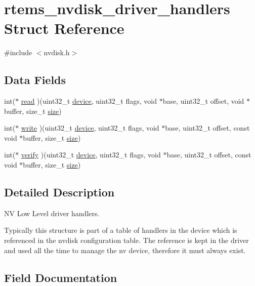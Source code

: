 \hypertarget{structrtems__nvdisk__driver__handlers}{}\section{rtems\+\_\+nvdisk\+\_\+driver\+\_\+handlers Struct Reference}
\label{structrtems__nvdisk__driver__handlers}


{\ttfamily \#include $<$nvdisk.\+h$>$}

\subsection*{Data Fields}
\begin{DoxyCompactItemize}
\item 
int($\ast$ \mbox{\hyperlink{structrtems__nvdisk__driver__handlers_a314418826d3970966452a2d6bfcd2361}{read}} )(uint32\+\_\+t \mbox{\hyperlink{structdevice}{device}}, uint32\+\_\+t flags, void $\ast$base, uint32\+\_\+t offset, void $\ast$buffer, size\+\_\+t \mbox{\hyperlink{sun4u_2tte_8h_a245260f6f74972558f61b85227df5aae}{size}})
\item 
int($\ast$ \mbox{\hyperlink{structrtems__nvdisk__driver__handlers_af7a21d161ca6091f211fa5ec327c117e}{write}} )(uint32\+\_\+t \mbox{\hyperlink{structdevice}{device}}, uint32\+\_\+t flags, void $\ast$base, uint32\+\_\+t offset, const void $\ast$buffer, size\+\_\+t \mbox{\hyperlink{sun4u_2tte_8h_a245260f6f74972558f61b85227df5aae}{size}})
\item 
int($\ast$ \mbox{\hyperlink{structrtems__nvdisk__driver__handlers_ad5d4fe32f4e817ed04f6577fe7f832a0}{verify}} )(uint32\+\_\+t \mbox{\hyperlink{structdevice}{device}}, uint32\+\_\+t flags, void $\ast$base, uint32\+\_\+t offset, const void $\ast$buffer, size\+\_\+t \mbox{\hyperlink{sun4u_2tte_8h_a245260f6f74972558f61b85227df5aae}{size}})
\end{DoxyCompactItemize}


\subsection{Detailed Description}
NV Low Level driver handlers.

Typically this structure is part of a table of handlers in the device which is referenced in the nvdisk configuration table. The reference is kept in the driver and used all the time to manage the nv device, therefore it must always exist. 

\subsection{Field Documentation}
\mbox{\label{structrtems__nvdisk__driver__handlers_a314418826d3970966452a2d6bfcd2361}} 
